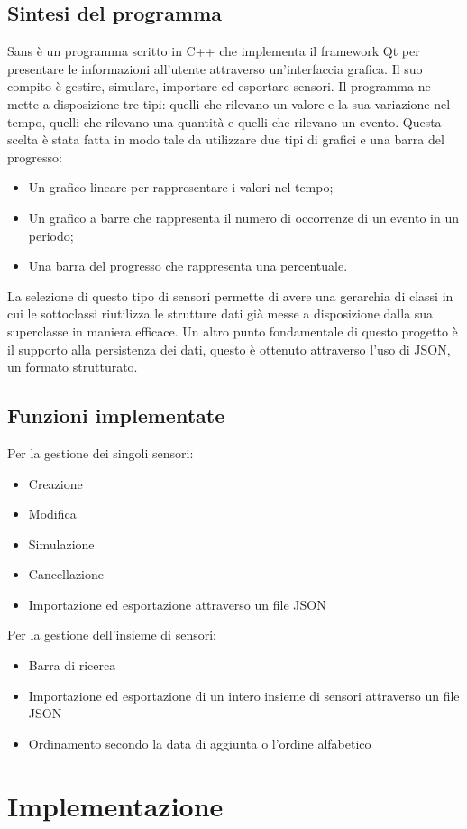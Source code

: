 \documentclass[a4paper]{article}
\begin{document}
\subsection{Sintesi del programma}
Sans è un programma scritto in C++ che implementa il framework Qt per presentare le informazioni all'utente attraverso un'interfaccia grafica. Il suo compito è gestire, simulare, importare ed esportare sensori.
Il programma ne mette a disposizione tre tipi: quelli che rilevano un valore e la sua variazione nel tempo, quelli che rilevano una quantità e quelli che rilevano un evento.
Questa scelta è stata fatta in modo tale da utilizzare due tipi di grafici e una barra del progresso: 
\begin{itemize}
    \item Un grafico lineare per rappresentare i valori nel tempo;
    \item Un grafico a barre che rappresenta il numero di occorrenze di un evento in un periodo;
    \item Una barra del progresso che rappresenta una percentuale.
\end{itemize}
La selezione di questo tipo di sensori permette di avere una gerarchia di classi in cui le sottoclassi riutilizza le strutture dati già messe a disposizione dalla sua superclasse in maniera efficace.
Un altro punto fondamentale di questo progetto è il supporto alla persistenza dei dati, questo è ottenuto attraverso l'uso di JSON, un formato strutturato.
\subsection{Funzioni implementate}
Per la gestione dei singoli sensori:
\begin{itemize}
    \item Creazione
    \item Modifica
    \item Simulazione
    \item Cancellazione
    \item Importazione ed esportazione attraverso un file JSON
\end{itemize}
Per la gestione dell'insieme di sensori:
\begin{itemize}
    \item Barra di ricerca
    \item Importazione ed esportazione di un intero insieme di sensori attraverso un file JSON
    \item Ordinamento secondo la data di aggiunta o l'ordine alfabetico
\end{itemize}
\clearpage
\section{Implementazione}
\end{document}
